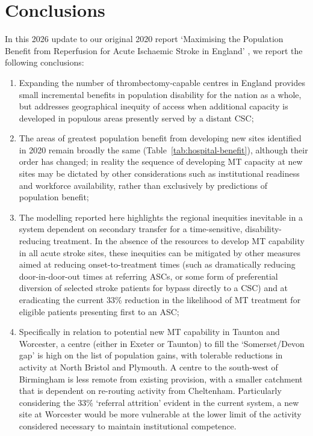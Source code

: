 \section{Conclusions}

In this 2026 update to our original 2020 report `Maximising the Population Benefit from Reperfusion for Acute Ischaemic Stroke in England' \cite{allen2020}, we report the following conclusions:

\begin{enumerate}
    \item Expanding the number of thrombectomy-capable centres in England provides small incremental benefits in population disability for the nation as a whole, but addresses geographical inequity of access when additional capacity is developed in populous areas presently served by a distant CSC;
    \item The areas of greatest population benefit from developing new sites identified in 2020 remain broadly the same (Table~\ref{tab:hospital-benefit}), although their order has changed; in reality the sequence of developing MT capacity at new sites may be dictated by other considerations such as institutional readiness and workforce availability, rather than exclusively by predictions of population benefit;
    \item The modelling reported here highlights the regional inequities inevitable in a system dependent on secondary transfer for a time-sensitive, disability-reducing treatment. In the absence of the resources to develop MT capability in all acute stroke sites, these inequities can be mitigated by other measures aimed at reducing onset-to-treatment times (such as dramatically reducing door-in-door-out times at referring ASCs, or some form of preferential diversion of selected stroke patients for bypass directly to a CSC) and at eradicating the current 33\% reduction in the likelihood of MT treatment for eligible patients presenting first to an ASC;
    \item Specifically in relation to potential new MT capability in Taunton and Worcester, a centre (either in Exeter or Taunton) to fill the `Somerset/Devon gap' is high on the list of population gains, with tolerable reductions in activity at North Bristol and Plymouth. A centre to the south-west of Birmingham is less remote from existing provision, with a smaller catchment that is dependent on re-routing activity from Cheltenham. Particularly considering the 33\% `referral attrition' evident in the current system, a new site at Worcester would be more vulnerable at the lower limit of the activity considered necessary to maintain institutional competence.
\end{enumerate}

